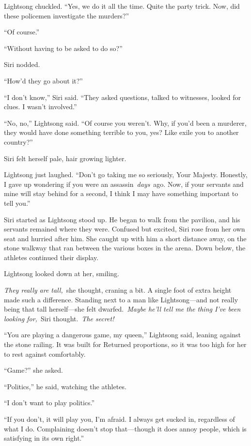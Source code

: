 Lightsong chuckled. “Yes, we do it all the time. Quite the party trick. Now, did these policemen investigate the murders?”

“Of course.”

“Without having to be asked to do so?”

Siri nodded.

“How’d they go about it?”

“I don’t know,” Siri said. “They asked questions, talked to witnesses, looked for clues. I wasn’t involved.”

“No, no,” Lightsong said. “Of course you weren’t. Why, if you’d been a murderer, they would have done something terrible to you, yes? Like exile you to another country?”

Siri felt herself pale, hair growing lighter.

Lightsong just laughed. “Don’t go taking me so seriously, Your Majesty. Honestly, I gave up wondering if you were an assassin~\textit{days}~ago. Now, if your servants and mine will stay behind for a second, I think I may have something important to tell you.”

Siri started as Lightsong stood up. He began to walk from the pavilion, and his servants remained where they were. Confused but excited, Siri rose from her own seat and hurried after him. She caught up with him a short distance away, on the stone walkway that ran between the various boxes in the arena. Down below, the athletes continued their display.

Lightsong looked down at her, smiling.

\textit{They really are tall,}~she thought, craning a bit. A single foot of extra height made such a difference. Standing next to a man like Lightsong—and not really being that tall herself—she felt dwarfed.~\textit{Maybe he’ll tell me the thing I’ve been looking for,}~Siri thought.~\textit{The secret!}

“You are playing a dangerous game, my queen,” Lightsong said, leaning against the stone railing. It was built for Returned proportions, so it was too high for her to rest against comfortably.

“Game?” she asked.

“Politics,” he said, watching the athletes.

“I don’t want to play politics.”

“If you don’t, it will play you, I’m afraid. I always get sucked in, regardless of what I do. Complaining doesn’t stop that—though it does annoy people, which is satisfying in its own right.”

